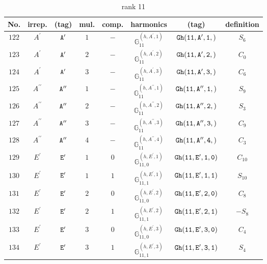 \documentclass[fleqn,8pt]{jsarticle}
\begin{document}
\begin{table}[ht!]
\begin{center}
\caption{rank 11}
\renewcommand{\arraystretch}{1.3}
\begin{tabular}{cccccccc} \hline \hline
No. & irrep. & (tag) & mul. & comp. & harmonics & (tag) & definition \\ \hline
$ 122 $ & $ A^{\prime} $ & $ {\tt A'} $ & $ 1 $ & $ - $ & $ \mathbb{G}_{11}^{(h,A^{\prime},1)} $ & $ {\tt Gh(11,A',1,)} $ & $ S_{6} $ \\
$ 123 $ & $ A^{\prime} $ & $ {\tt A'} $ & $ 2 $ & $ - $ & $ \mathbb{G}_{11}^{(h,A^{\prime},2)} $ & $ {\tt Gh(11,A',2,)} $ & $ C_{0} $ \\
$ 124 $ & $ A^{\prime} $ & $ {\tt A'} $ & $ 3 $ & $ - $ & $ \mathbb{G}_{11}^{(h,A^{\prime},3)} $ & $ {\tt Gh(11,A',3,)} $ & $ C_{6} $ \\
$ 125 $ & $ A^{\prime\prime} $ & $ {\tt A''} $ & $ 1 $ & $ - $ & $ \mathbb{G}_{11}^{(h,A^{\prime\prime},1)} $ & $ {\tt Gh(11,A'',1,)} $ & $ S_{9} $ \\
$ 126 $ & $ A^{\prime\prime} $ & $ {\tt A''} $ & $ 2 $ & $ - $ & $ \mathbb{G}_{11}^{(h,A^{\prime\prime},2)} $ & $ {\tt Gh(11,A'',2,)} $ & $ S_{3} $ \\
$ 127 $ & $ A^{\prime\prime} $ & $ {\tt A''} $ & $ 3 $ & $ - $ & $ \mathbb{G}_{11}^{(h,A^{\prime\prime},3)} $ & $ {\tt Gh(11,A'',3,)} $ & $ C_{9} $ \\
$ 128 $ & $ A^{\prime\prime} $ & $ {\tt A''} $ & $ 4 $ & $ - $ & $ \mathbb{G}_{11}^{(h,A^{\prime\prime},4)} $ & $ {\tt Gh(11,A'',4,)} $ & $ C_{3} $ \\
$ 129 $ & $ E^{\prime} $ & $ {\tt E'} $ & $ 1 $ & $ 0 $ & $ \mathbb{G}_{11,0}^{(h,E^{\prime},1)} $ & $ {\tt Gh(11,E',1,0)} $ & $ C_{10} $ \\
$ 130 $ & $ E^{\prime} $ & $ {\tt E'} $ & $ 1 $ & $ 1 $ & $ \mathbb{G}_{11,1}^{(h,E^{\prime},1)} $ & $ {\tt Gh(11,E',1,1)} $ & $ S_{10} $ \\
$ 131 $ & $ E^{\prime} $ & $ {\tt E'} $ & $ 2 $ & $ 0 $ & $ \mathbb{G}_{11,0}^{(h,E^{\prime},2)} $ & $ {\tt Gh(11,E',2,0)} $ & $ C_{8} $ \\
$ 132 $ & $ E^{\prime} $ & $ {\tt E'} $ & $ 2 $ & $ 1 $ & $ \mathbb{G}_{11,1}^{(h,E^{\prime},2)} $ & $ {\tt Gh(11,E',2,1)} $ & $ - S_{8} $ \\
$ 133 $ & $ E^{\prime} $ & $ {\tt E'} $ & $ 3 $ & $ 0 $ & $ \mathbb{G}_{11,0}^{(h,E^{\prime},3)} $ & $ {\tt Gh(11,E',3,0)} $ & $ C_{4} $ \\
$ 134 $ & $ E^{\prime} $ & $ {\tt E'} $ & $ 3 $ & $ 1 $ & $ \mathbb{G}_{11,1}^{(h,E^{\prime},3)} $ & $ {\tt Gh(11,E',3,1)} $ & $ S_{4} $ \\

\end{tabular}
\end{center}
\end{table}
\end{document}
